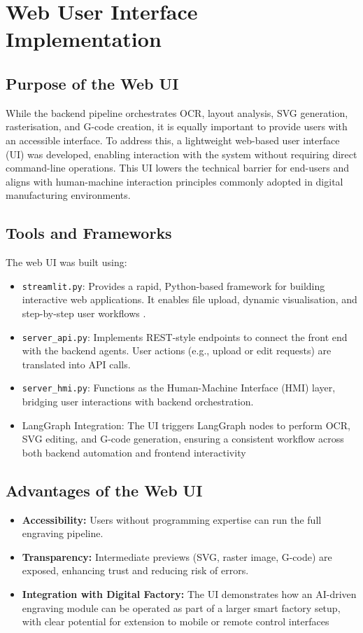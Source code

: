 \section{Web User Interface Implementation}
\subsection{Purpose of the Web UI}
While the backend pipeline orchestrates OCR, layout analysis, SVG generation, rasterisation, and G-code creation, it is equally important to provide users with an accessible interface. To address this, a lightweight web-based user interface (UI) was developed, enabling interaction with the system without requiring direct command-line operations. This UI lowers the technical barrier for end-users and aligns with human-machine interaction principles commonly adopted in digital manufacturing environments.

\subsection{Tools and Frameworks}
The web UI was built using:
\begin{itemize}
	\item \texttt{streamlit.py}: Provides a rapid, Python-based framework for building interactive web applications. It enables file upload, dynamic visualisation, and step-by-step user workflows .
	\item \texttt{server\_api.py}: Implements REST-style endpoints to connect the front end with the backend agents. User actions (e.g., upload or edit requests) are translated into API calls.
	\item \texttt{server\_hmi.py}: Functions as the Human-Machine Interface (HMI) layer, bridging user interactions with backend orchestration.
	\item LangGraph Integration: The UI triggers LangGraph nodes to perform OCR, SVG editing, and G-code generation, ensuring a consistent workflow across both backend automation and frontend interactivity
\end{itemize}

\subsection{Advantages of the Web UI}
\begin{itemize}
	\item \textbf{Accessibility:} Users without programming expertise can run the full engraving pipeline.
	\item \textbf{Transparency:} Intermediate previews (SVG, raster image, G-code) are exposed, enhancing trust and reducing risk of errors.
	\item \textbf{Integration with Digital Factory:} The UI demonstrates how an AI-driven engraving module can be operated as part of a larger smart factory setup, with clear potential for extension to mobile or remote control interfaces
	
\end{itemize}

